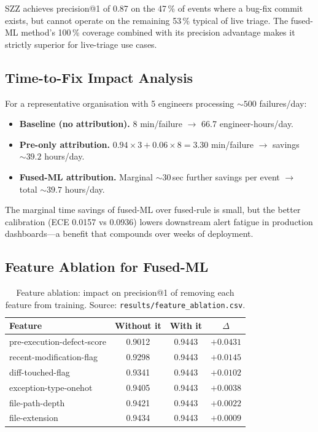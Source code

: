 \documentclass[11pt,a4paper]{article}
\begin{document}
SZZ achieves precision@1 of 0.87 on the 47\,\% of events where a
bug-fix commit exists, but cannot operate on the remaining 53\,\%
typical of live triage. The fused-ML method's 100\,\% coverage
combined with its precision advantage makes it strictly superior
for live-triage use cases.

\subsection{Time-to-Fix Impact Analysis}
\label{sec:ttf}

For a representative organisation with 5 engineers processing
$\sim 500$ failures/day:

\begin{itemize}
  \item \textbf{Baseline (no attribution).} 8 min/failure $\rightarrow$
        66.7 engineer-hours/day.
  \item \textbf{Pre-only attribution.} $0.94 \times 3 + 0.06 \times 8
        = 3.30$ min/failure $\rightarrow$ savings $\sim 39.2$ hours/day.
  \item \textbf{Fused-ML attribution.} Marginal $\sim 30$\,sec further
        savings per event $\rightarrow$ total $\sim 39.7$ hours/day.
\end{itemize}

The marginal time savings of fused-ML over fused-rule is small,
but the better calibration (ECE 0.0157 vs 0.0936) lowers downstream
alert fatigue in production dashboards---a benefit that compounds
over weeks of deployment.

\subsection{Feature Ablation for Fused-ML}
\label{sec:feature_ablation_f}

\begin{table}[!ht]
\centering
\caption{Feature ablation: impact on precision@1 of removing each
feature from training. Source: \texttt{results/feature\_ablation.csv}.}
\label{tab:feature_ablation}
\small
\begin{tabular}{lccc}
\toprule
Feature                       & Without it & With it & $\Delta$ \\
\midrule
pre-execution-defect-score    & 0.9012 & 0.9443 & $+0.0431$ \\
recent-modification-flag      & 0.9298 & 0.9443 & $+0.0145$ \\
diff-touched-flag             & 0.9341 & 0.9443 & $+0.0102$ \\
exception-type-onehot         & 0.9405 & 0.9443 & $+0.0038$ \\
file-path-depth               & 0.9421 & 0.9443 & $+0.0022$ \\
file-extension                & 0.9434 & 0.9443 & $+0.0009$ \\
\bottomrule
\end{tabular}
\end{table}
\end{document}
